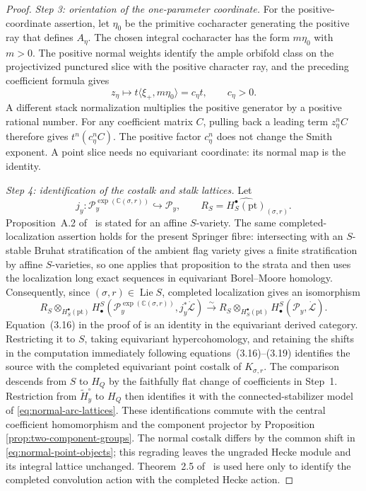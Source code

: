 \documentclass[10pt,a4paper]{amsart}
\begin{document}
\begin{proof}
\smallskip
\noindent\emph{Step 3: orientation of the one-parameter coordinate.}
For the positive-coordinate assertion, let $\eta_0$ be the primitive
cocharacter generating the positive ray that defines $A_\eta$.  The chosen
integral cocharacter has the form $m\eta_0$ with $m>0$.  The positive normal
weights identify the ample orbifold class on the projectivized punctured
slice with the positive character ray, and the preceding coefficient formula
gives
\[
 z_\eta\longmapsto
 t\langle\xi_+,m\eta_0\rangle=c_\eta t,
 \qquad c_\eta>0.
\]
A different stack normalization multiplies the positive generator by a
positive rational number.  For any coefficient matrix $C$, pulling back a
leading term $z_\eta^nC$ therefore
gives $t^n(c_\eta^nC)$.  The positive factor $c_\eta^n$ does not change the
Smith exponent.  A point slice needs no equivariant coordinate: its
normal map is the identity.

\smallskip
\noindent\emph{Step 4: identification of the costalk and stalk lattices.}
Let
\[
 j_y:\mathcal P_y^{\exp(\mathbb C(\sigma,r))}
       \hookrightarrow\mathcal P_y,
 \qquad
 R_S=\widehat{H_S^\bullet(\mathrm{pt})}_{(\sigma,r)}.
\]
Proposition~A.2 of~\cite{Solleveld} is stated for an affine $S$-variety.
The same completed-localization assertion holds for the present Springer
fibre: intersecting with an $S$-stable Bruhat stratification of the ambient
flag variety gives a finite stratification by affine $S$-varieties, so one
applies that proposition to the strata and then uses the localization long
exact sequences in equivariant Borel--Moore homology.  Consequently, since
$(\sigma,r)\in\operatorname{Lie}S$,
completed localization gives an isomorphism
\[
 R_S\otimes_{H_S^\bullet(\mathrm{pt})}
 H_\bullet^S\!\left(
   \mathcal P_y^{\exp(\mathbb C(\sigma,r))},j_y^*\dot{\mathcal L}
 \right)
 \xrightarrow{\sim}
 R_S\otimes_{H_S^\bullet(\mathrm{pt})}
 H_\bullet^S(\mathcal P_y,\dot{\mathcal L}).
\]
Equation~(3.16) in the proof of \cite[Proposition~3.5(a)]{Solleveld} is an
identity in the equivariant derived category.  Restricting it to $S$, taking
equivariant hypercohomology, and retaining the shifts in the computation
immediately following equations~(3.16)--(3.19) identifies the source with
the completed equivariant point costalk of $K_{\sigma,r}$.
The comparison descends from $S$ to $H_Q$ by the faithfully flat
change of coefficients in Step~1.  Restriction from
$\widetilde H_y^\circ$ to $H_Q$ then identifies it with the
connected-stabilizer model of \eqref{eq:normal-arc-lattices}.
These identifications commute with the central coefficient
homomorphism and the component projector by Proposition
\ref{prop:two-component-groups}.  The normal costalk differs by the common shift in
\eqref{eq:normal-point-objects}; this regrading leaves the ungraded
Hecke module and its integral lattice unchanged.  Theorem~2.5
of~\cite{Solleveld} is used here
only to identify the completed convolution action with the completed Hecke
action.


\end{proof}
\end{document}
